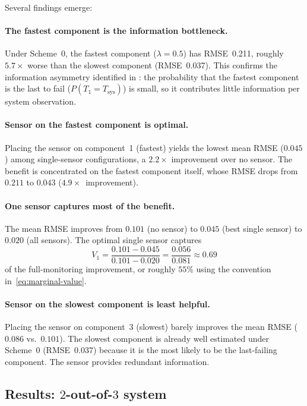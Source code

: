 \documentclass[12pt]{article}
\theoremstyle{definition}
\theoremstyle{remark}
\begin{document}
Several findings emerge:

\paragraph{The fastest component is the information bottleneck.}
Under Scheme~0, the fastest component ($\lambda = 0.5$) has RMSE~0.211,
roughly $5.7\times$ worse than the slowest component (RMSE~0.037).
This confirms the information asymmetry identified in \citet{Towell2026}:
the probability that the fastest component is the last to fail
($P(T_1 = T_{\mathrm{sys}})$) is small, so it contributes little
information per system observation.

\paragraph{Sensor on the fastest component is optimal.}
Placing the sensor on component~1 (fastest) yields the lowest mean
RMSE ($0.045$) among single-sensor configurations, a $2.2\times$
improvement over no sensor.  The benefit is concentrated on the
fastest component itself, whose RMSE drops from $0.211$ to $0.043$
($4.9\times$~improvement).

\paragraph{One sensor captures most of the benefit.}
The mean RMSE improves from $0.101$ (no sensor) to $0.045$ (best
single sensor) to $0.020$ (all sensors).  The optimal single sensor
captures
\[
  V_1 = \frac{0.101 - 0.045}{0.101 - 0.020} = \frac{0.056}{0.081} \approx 0.69
\]
of the full-monitoring improvement, or roughly $55$\% using the
convention in~\eqref{eq:marginal-value}.

\paragraph{Sensor on the slowest component is least helpful.}
Placing the sensor on component~3 (slowest) barely improves the mean
RMSE ($0.086$ vs.\ $0.101$).  The slowest component is already well
estimated under Scheme~0 (RMSE~$0.037$) because it is the most likely
to be the last-failing component.  The sensor provides redundant
information.

\subsection{Results: \texorpdfstring{$2$-out-of-$3$}{2-out-of-3} system}
\label{sec:results-voting}
\end{document}
